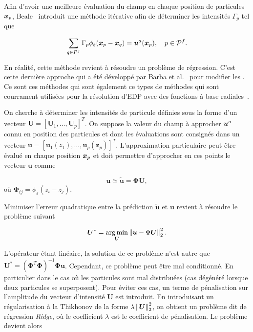 Afin d'avoir une meilleure évaluation du champ en chaque position de particules $\bm{x}_p$, Beale~\cite{beale_accuracy_1988} introduit une méthode itérative afin de déterminer les intensités $\Gamma_p$ tel que

\begin{equation*}
    \sum_{q \in P^f} \Gamma_p \phi_\varepsilon(\bm{x}_p - \bm{x}_q) = \bm{u}^a(\bm{x}_p), \quad p \in \mathcal{P}^f.
\end{equation*}

En réalité, cette méthode revient à résoudre un problème de régression. C'est cette dernière approche qui a été développé par Barba et al.~\cite{barba_lorena_a_vortex_2004} pour modifier les . Ce sont ces méthodes qui sont également ce types de méthodes qui sont courrament utilisées pour la résolution d'EDP avec des fonctions à base radiales~\cite{fornberg_flyer_2015}.

On cherche à déterminer les intensités de particule définies sous la forme d'un vecteur $\bm{U} = [\bm U_1, \dots, \bm U_p]^T$. On suppose la valeur du champ à approcher $\bm{u}^a$ connu en position des particules et dont les évaluations sont consignés dans un vecteur $\bm{u} = [\bm u_1(z_1), \dots, \bm u_p(\bm z_p)]^T$. L'approximation particulaire peut être évalué en chaque position $\bm{x}_p$ et doit permettre d'approcher en ces points le vecteur $\bm{u}$ comme

\begin{equation*}
    \bm{u} \simeq \tilde{\bm u} = \bm \Phi \bm{U},
\end{equation*}où $\bm \Phi_{ij} = \phi_\varepsilon(z_i - z_j)$.

Minimiser l'erreur quadratique entre la prédiction $\tilde{\bm u}$ et $\bm{u}$ revient à résoudre le problème suivant

\begin{equation*}
    \bm{U}^*= \operatorname*{arg\,min}_{\bm{U}} \left\lVert \bm{u} - \Phi \bm{U} \right\rVert^2_2.
\end{equation*}

L'opérateur étant linéaire, la solution de ce problème n'est autre que $\bm U^*  = (\bm \Phi^T \bm \Phi)^{-1} \bm \Phi \bm{u}$. Cependant, ce problème peut être mal conditionné. En particulier dans le cas où les particules sont mal distribuées (cas dégénéré lorsque deux particules se superposent). Pour éviter ces cas, un terme de pénalisation sur l'amplitude du vecteur d'intensité $\bm{U}$ est introduit. En introduisant un régularisation à la Thikhonov de la forme $\lambda \left\lVert \bm U \right\rVert_2^2$, on obtient un problème dit de régression \textit{Ridge}, où le coefficient $\lambda$ est le coefficient de pénalisation. Le problème devient alors

